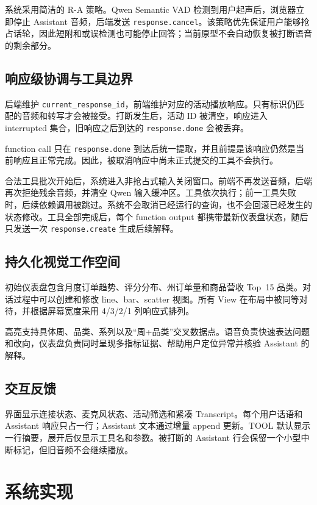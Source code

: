 \documentclass[UTF8,a4paper,10.5pt]{ctexart}
\begin{document}
系统采用简洁的 R-A 策略。Qwen Semantic VAD 检测到用户起声后，浏览器立即停止 Assistant 音频，后端发送 \texttt{response.cancel}。该策略优先保证用户能够抢占话轮，因此短附和或误检测也可能停止回答；当前原型不会自动恢复被打断语音的剩余部分。

\subsection{响应级协调与工具边界}

后端维护 \texttt{current\_response\_id}，前端维护对应的活动播放响应。只有标识仍匹配的音频和转写才会被接受。打断发生后，活动 ID 被清空，响应进入 interrupted 集合，旧响应之后到达的 \texttt{response.done} 会被丢弃。

function call 只在 \texttt{response.done} 到达后统一提取，并且前提是该响应仍然是当前响应且正常完成。因此，被取消响应中尚未正式提交的工具不会执行。

合法工具批次开始后，系统进入非抢占式输入关闭窗口。前端不再发送音频，后端再次拒绝残余音频，并清空 Qwen 输入缓冲区。工具依次执行；前一工具失败时，后续依赖调用被跳过。系统不会取消已经运行的查询，也不会回滚已经发生的状态修改。工具全部完成后，每个 function output 都携带最新仪表盘状态，随后只发送一次 \texttt{response.create} 生成后续解释。

\subsection{持久化视觉工作空间}

初始仪表盘包含月度订单趋势、评分分布、州订单量和商品营收 Top~15 品类。对话过程中可以创建和修改 line、bar、scatter 视图。所有 View 在布局中被同等对待，并根据屏幕宽度采用 4/3/2/1 列响应式排列。

高亮支持具体周、品类、系列以及“周+品类”交叉数据点。语音负责快速表达问题和改向，仪表盘负责同时呈现多指标证据、帮助用户定位异常并核验 Assistant 的解释。

\subsection{交互反馈}

界面显示连接状态、麦克风状态、活动筛选和紧凑 Transcript。每个用户话语和 Assistant 响应只占一行；Assistant 文本通过增量 append 更新。TOOL 默认显示一行摘要，展开后仅显示工具名和参数。被打断的 Assistant 行会保留一个小型中断标记，但旧音频不会继续播放。

\section{系统实现}
\end{document}
